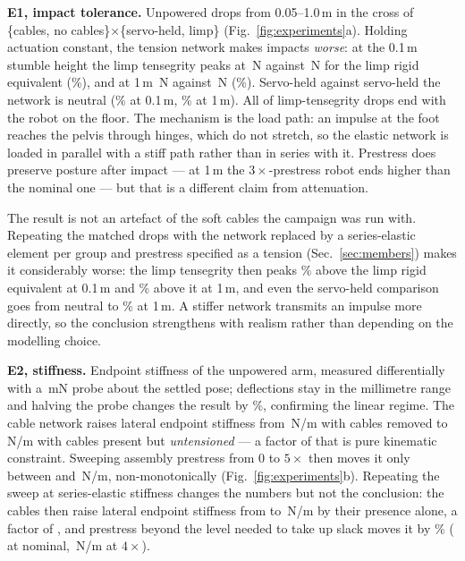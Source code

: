 \documentclass[conference]{IEEEtran}
\begin{document}
\textbf{E1, impact tolerance.} Unpowered drops from 0.05--1.0\,m in the cross
of \{cables, no cables\}$\times$\{servo-held, limp\}
(Fig.~\ref{fig:experiments}a). Holding actuation constant, the tension network
makes impacts \emph{worse}: at the 0.1\,m stumble height the limp tensegrity
peaks at \eOnePassiveTsgStumble\,N against \eOnePassiveRigidStumble\,N for the
limp rigid equivalent (\eOneDeltaPassiveStumble\%), and at 1\,m
\eOnePassiveTsgCrash\,N against \eOnePassiveRigidCrash\,N
(\eOneDeltaPassiveCrash\%). Servo-held against servo-held the network is
neutral (\eOneDeltaHeldStumble\% at 0.1\,m, \eOneDeltaHeldCrash\% at 1\,m).
All \eOnePassiveFell{} of \eOnePassiveN{} limp-tensegrity drops end with the
robot on the floor. The mechanism is the load path: an impulse at the foot
reaches the pelvis through hinges, which do not stretch, so the elastic
network is loaded in parallel with a stiff path rather than in series with it.
Prestress does preserve posture after impact --- at 1\,m the
$3\times$-prestress robot ends higher than the nominal one --- but that is a
different claim from attenuation.

The result is not an artefact of the soft cables the campaign was run with.
Repeating the matched drops with the network replaced by a series-elastic
element per group and prestress specified as a tension (Sec.~\ref{sec:members})
makes it considerably worse: the limp tensegrity then peaks
\physOneLimpTen\% above the limp rigid equivalent at 0.1\,m and
\physOneLimpHundred\% above it at 1\,m, and even the servo-held comparison goes
from neutral to \physOneHeldHundred\% at 1\,m. A stiffer network transmits an
impulse more directly, so the conclusion strengthens with realism rather than
depending on the modelling choice.

\textbf{E2, stiffness.} Endpoint stiffness of the unpowered arm, measured
differentially with a \stiffProbe\,mN probe about the settled pose;
deflections stay in the millimetre range and halving the probe changes the
result by \stiffLinearity\%, confirming the linear regime. The cable network
raises lateral endpoint stiffness from \stiffNoCables\,N/m with cables removed
to \stiffZeroPre\,N/m with cables present but \emph{untensioned} --- a factor
of \stiffCablesRatio{} that is pure kinematic constraint. Sweeping assembly
prestress from $0$ to $5\times$ then moves it only between \stiffPreLo{} and
\stiffPreHi\,N/m, non-monotonically (Fig.~\ref{fig:experiments}b). Repeating the sweep at
series-elastic stiffness changes the numbers but not the conclusion: the
cables then raise lateral endpoint stiffness from \physTwoNoCables{} to
\physTwoZeroPre\,N/m by their presence alone, a factor of
\physTwoCableRatio{}, and prestress beyond the level needed to take up slack
moves it by \physTwoEngaged\% (\physTwoNominal{} at nominal,
\physTwoHigh\,N/m at $4\times$).
\end{document}
